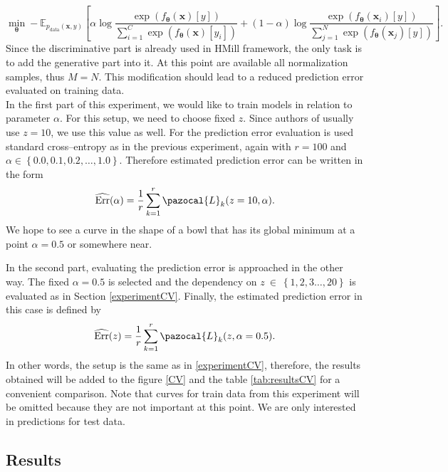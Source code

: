 \begin{equation}
	\min_{\boldsymbol{\theta}}- \mathbb{E}_{p_{\mathrm{data}}(\boldsymbol{x},y)}\left[\alpha\log \frac{\exp\left({f_{\boldsymbol{\theta}}\left(\boldsymbol{x}\right)[y]}\right)}{\sum_{i=1}^C\exp\left({f_{\boldsymbol{\theta}}\left(\boldsymbol{x}\right)[y_i]}\right)}+ \left(1-\alpha\right)\log \frac{\exp\left({f_{\boldsymbol{\theta}}\left(\boldsymbol{x}_i\right)[y]}\right)}{\sum_{j=1}^N\exp\left({f_{\boldsymbol{\theta}}\left(\boldsymbol{x}_j\right)[y]}\right)} \right].
	\end{equation}
Since the discriminative part is already used in HMill framework, the only task is to add the generative part into it. At this point are available all normalization samples, thus $M=N$. This modification should lead to a reduced prediction error evaluated on training data.\\
In the first part of this experiment, we would like to train models in relation to parameter $\alpha$. For this setup, we need to choose fixed $z$. Since authors of \cite{mandlik} usually use $z=10$, we use this value as well. For the prediction error evaluation is used standard cross--entropy as in the previous experiment, again with $r=100$ and $\alpha \in \left\{0.0, 0.1, 0.2,\dots,1.0\right\}$. Therefore estimated prediction error can be written in the form
\begin{equation}
	\widehat{\mathrm{Err}}(\alpha) = \frac{1}{r}\sum_{k=1}^r \pazocal{L}_k(z=10, \alpha).
\end{equation}
We hope to see a curve in the shape of a bowl that has its global minimum at a point $\alpha=0.5$ or somewhere near.

In the second part, evaluating the prediction error is approached in the other way. The fixed $\alpha = 0.5$ is selected and the dependency on $z~\in~\left\{1,2,3\dots,20 \right\}$ is evaluated as in Section \ref{experimentCV}. Finally, the estimated prediction error in this case is defined by
\begin{equation}
	\widehat{\mathrm{Err}}(z) = \frac{1}{r}\sum_{k=1}^r \pazocal{L}_k(z, \alpha =0.5).
\end{equation}
In other words, the setup is the same as in \ref{experimentCV}, therefore, the results obtained will be added to the figure \ref{CV} and the table \ref{tab:resultsCV} for a convenient comparison. Note that curves for train data from this experiment will be omitted because they are not important at this point. We are only interested in predictions for test data.  
\clearpage
\subsection{Results}



